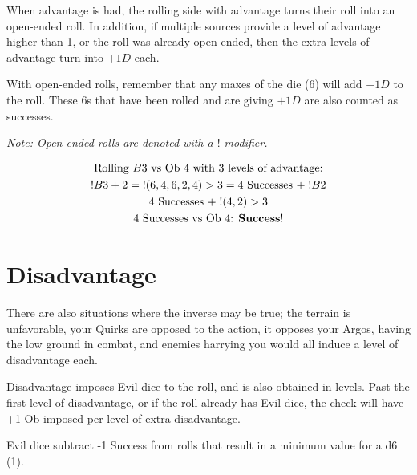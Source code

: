 \documentclass[../main.tex]{subfiles}
\begin{document}
        When advantage is had, the rolling side with advantage turns their roll into an open-ended roll. In addition, if multiple sources provide a level of advantage higher than 1, or the roll was already open-ended, then the extra levels of advantage turn into $+1D$ each.

        With open-ended rolls, remember that any maxes of the die (6) will add $+1D$ to the roll. These 6s that have been rolled and are giving $+1D$ are also counted as successes. 
        
        \emph{Note: Open-ended rolls are denoted with a $!$ modifier.}
        \\
        \begin{mdframed}[style=Arrata]
            \begin{equation*}
                \begin{gathered}
                    \text{Rolling $B$3 vs Ob 4 with 3 levels of advantage:}         \\
                    !B3 + 2 = \; !(6, 4, 6, 2, 4)>3 = 4 \text{ Successes } +\; !B2  \\
                    4 \text{ Successes } +\; !(4, 2)>3                              \\
                    4 \text{ Successes  vs Ob 4: \textbf{Success}!}
                \end{gathered}
            \end{equation*}    
        \end{mdframed}

    \section{Disadvantage}

        There are also situations where the inverse may be true; the terrain is unfavorable, your Quirks are opposed to the action, it opposes your Argos, having the low ground in combat, and enemies harrying you would all induce a level of disadvantage each.

        Disadvantage imposes Evil dice to the roll, and is also obtained in levels. Past the first level of disadvantage, or if the roll already has Evil dice, the check will have +1 Ob imposed per level of extra disadvantage.

        Evil dice subtract -1 Success from rolls that result in a minimum value for a d6 (1). 
        
\end{document}
